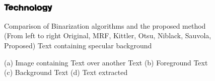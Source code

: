 \begin{figure}[t]
{\includegraphics[height=.5in,width=1in]{results/res_2/10/res.eps}
}
\label{fig:subfig11}
\caption
{Comparison of Binarization algorithms and the proposed method 
(From left to right Original, MRF, Kittler, Otsu, Niblack, Sauvola, Proposed)
Text containing specular background}
\label{fig:6}
\end{figure}
\begin{figure}[htbp]
\centering
{}
\caption
{(a) Image containing Text over another Text (b) Foreground Text (c) Background Text (d)
Text extracted}
\label{fig:7}
\end{figure}
